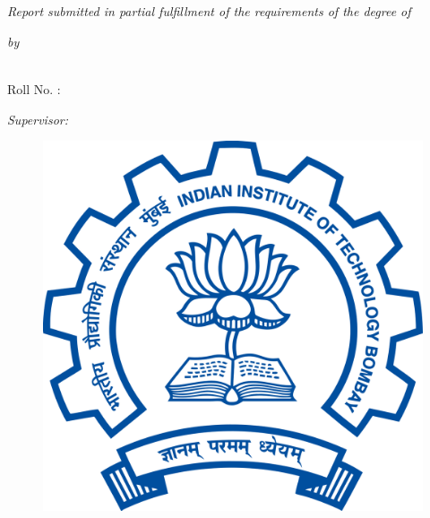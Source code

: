 
\begin{titlepage}
		\begin{center}
			
			\HRule \\[0.4cm] %
			{\huge \bfseries \ttitle\par}\vspace{0.4cm} %
			\HRule \\[1.5cm] %
			
			\large \textit{Report submitted in partial fulfillment of the requirements of the degree of}
			\vspace{0.02\textwidth}
			\\ \degreename
			
			\vspace{0.06\textwidth}
			\textit{by}
			
			\vspace{0.06\textwidth}
			\textbf{\authorname}
			\vspace{0.02\textwidth}
			\\ Roll No. : \matnumber
			
			\vspace{0.06\textwidth}
			\textit{Supervisor:}
			\vspace{0.02\textwidth}
			\\ \supname
			
			\vspace{0.1\textwidth}
			\begin{figure}[H]
				\centering
				\includegraphics[scale=0.12]{Figures/iitb-logo}
			\end{figure}
			

\end{center}
\end{titlepage}
